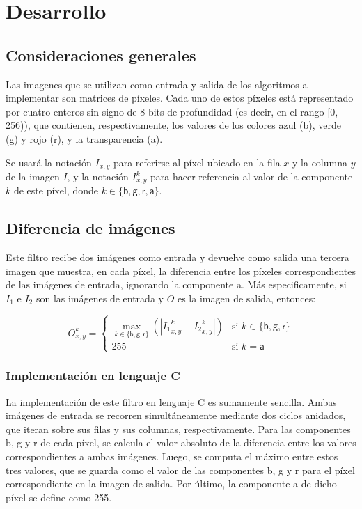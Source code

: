 \section{Desarrollo}

  \subsection{Consideraciones generales}
    Las imagenes que se utilizan como entrada y salida de los algoritmos a implementar son matrices de píxeles. Cada uno de estos píxeles está representado por cuatro enteros sin signo de 8 bits de profundidad (es decir, en el rango [0, 256)), que contienen, respectivamente, los valores de los colores azul (\textsf{b}), verde (\textsf{g}) y rojo (\textsf{r}), y la transparencia (\textsf{a}).

    Se usará la notación $I_{x,y}$ para referirse al píxel ubicado en la fila $x$ y la columna $y$ de la imagen $I$, y la notación $I_{x,y}^k$ para hacer referencia al valor de la componente $k$ de este píxel, donde $k \in \lbrace \mathsf{b, g, r, a} \rbrace$.
  
  \subsection{Diferencia de imágenes}
    Este filtro recibe dos imágenes como entrada y devuelve como salida una tercera imagen que muestra, en cada píxel, la diferencia entre los píxeles correspondientes de las imágenes de entrada, ignorando la componente \textsf{a}. Más especificamente, si $I_1$ e $I_2$ son las imágenes de entrada y $O$ es la imagen de salida, entonces:

    \[ O_{x,y}^k = \begin{cases}
      \displaystyle \max_{k \in \lbrace \mathsf{b, g, r} \rbrace} \left( \left\vert {I_1}_{x,y}^k - {I_2}_{x,y}^k \right\vert \right)
        & \text{si } k \in \lbrace \mathsf{b, g, r} \rbrace \\
      255
        & \text{si } k = \mathsf{a}
    \end{cases} \]

    \subsubsection{Implementación en lenguaje C}
      La implementación de este filtro en lenguaje C es sumamente sencilla. Ambas imágenes de entrada se recorren simultáneamente mediante dos ciclos anidados, que iteran sobre sus filas y sus columnas, respectivamente. Para las componentes \textsf{b}, \textsf{g} y \textsf{r} de cada píxel, se calcula el valor absoluto de la diferencia entre los valores correspondientes a ambas imágenes. Luego, se computa el máximo entre estos tres valores, que se guarda como el valor de las componentes \textsf{b}, \textsf{g} y \textsf{r} para el píxel correspondiente en la imagen de salida. Por último, la componente \textsf{a} de dicho píxel se define como 255.

